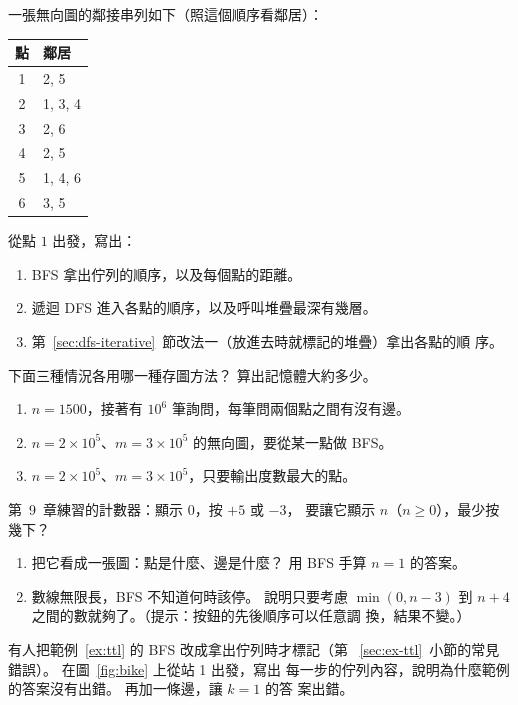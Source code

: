 \begin{drills}[label=drills:ch11]
\item 一張無向圖的鄰接串列如下（照這個順序看鄰居）：
\begin{center}
\begin{tabular}{c|l}
點 & 鄰居 \\
\hline
1 & 2, 5 \\
2 & 1, 3, 4 \\
3 & 2, 6 \\
4 & 2, 5 \\
5 & 1, 4, 6 \\
6 & 3, 5 \\
\end{tabular}
\end{center}
從點 $1$ 出發，寫出：
\begin{enumerate}
\item BFS 拿出佇列的順序，以及每個點的距離。
\item 遞迴 DFS 進入各點的順序，以及呼叫堆疊最深有幾層。
\item 第~\ref{sec:dfs-iterative}~節改法一（放進去時就標記的堆疊）拿出各點的順
序。
\end{enumerate}

\item 下面三種情況各用哪一種存圖方法？ 算出記憶體大約多少。
\begin{enumerate}
\item $n = 1500$，接著有 $10^6$ 筆詢問，每筆問兩個點之間有沒有邊。
\item $n = 2 \times 10^5$、$m = 3 \times 10^5$ 的無向圖，要從某一點做 BFS。
\item $n = 2 \times 10^5$、$m = 3 \times 10^5$，只要輸出度數最大的點。
\end{enumerate}

\item \label{drill:counter} 第~9~章練習的計數器：顯示 $0$，按 $+5$ 或 $-3$，
要讓它顯示 $n$（$n \ge 0$），最少按幾下？
\begin{enumerate}
\item 把它看成一張圖：點是什麼、邊是什麼？ 用 BFS 手算 $n = 1$ 的答案。
\item 數線無限長，BFS 不知道何時該停。 說明只要考慮
$\min(0, n - 3)$ 到 $n + 4$ 之間的數就夠了。（提示：按鈕的先後順序可以任意調
換，結果不變。）
\end{enumerate}

\item 有人把範例~\ref{ex:ttl} 的 BFS 改成拿出佇列時才標記（第
~\ref{sec:ex-ttl}~小節的常見錯誤）。 在圖~\ref{fig:bike} 上從站 1 出發，寫出
每一步的佇列內容，說明為什麼範例的答案沒有出錯。 再加一條邊，讓 $k = 1$ 的答
案出錯。


\end{drills}
